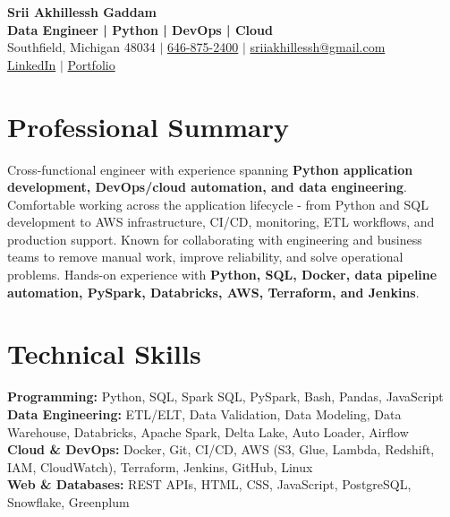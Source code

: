 \documentclass[letterpaper,10pt]{article}
\begin{document}
\fontsize{9.35pt}{10.45pt}\selectfont

\begin{center}
    {\LARGE \textbf{Srii Akhillessh Gaddam}} \\[-1pt]
    \textbf{Data Engineer | Python | DevOps | Cloud} \\[2pt]
    Southfield, Michigan 48034 $|$
    \href{tel:6468752400}{646-875-2400} $|$
    \href{mailto:sriiakhillessh@gmail.com}{sriiakhillessh@gmail.com} \\[1pt]
    \href{https://www.linkedin.com/in/srii-akhiilessh-gaddam-b48668191/}{LinkedIn} $|$
    \href{https://sriiakhillesshg.github.io/portfolio/}{Portfolio}
\end{center}
\vspace{-8pt}

\section{Professional Summary}
\small{Cross-functional engineer with experience spanning \textbf{Python application development, DevOps/cloud automation, and data engineering}. Comfortable working across the application lifecycle - from Python and SQL development to AWS infrastructure, CI/CD, monitoring, ETL workflows, and production support. Known for collaborating with engineering and business teams to remove manual work, improve reliability, and solve operational problems. Hands-on experience with \textbf{Python, SQL, Docker, data pipeline automation, PySpark, Databricks, AWS, Terraform, and Jenkins}.}

\section{Technical Skills}
\small{
\textbf{Programming:} Python, SQL, Spark SQL, PySpark, Bash, Pandas, JavaScript \\
\textbf{Data Engineering:} ETL/ELT, Data Validation, Data Modeling, Data Warehouse, Databricks, Apache Spark, Delta Lake, Auto Loader, Airflow \\
\textbf{Cloud \& DevOps:} Docker, Git, CI/CD, AWS (S3, Glue, Lambda, Redshift, IAM, CloudWatch), Terraform, Jenkins, GitHub, Linux \\
\textbf{Web \& Databases:} REST APIs, HTML, CSS, JavaScript, PostgreSQL, Snowflake, Greenplum
}
\end{document}
